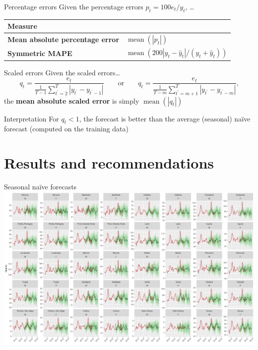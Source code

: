 \documentclass[12pt,aspectratio=169]{beamer}
\begin{document}
\begin{frame}{Percentage errors}
    Given the \alert{percentage} errors $p_{t} = 100 e_{t} / y_{t}$, \ldots
    \begin{center}
        \renewcommand{\arraystretch}{1.5}%
        \begin{tabular}{ll}
            \toprule
            \textbf{Measure} & \\
            \midrule
            \textbf{Mean absolute percentage error} & $\operatorname{mean}(|p_{t}|)$ \\
            \textbf{Symmetric MAPE}                 & $\operatorname{mean}(200 |y_{t} - \hat{y}_{t}| / (y_{t} + \hat{y}_{t}))$ \\
            \bottomrule
        \end{tabular}
    \end{center}
\end{frame}

\begin{frame}{Scaled errors}
    Given the \alert{scaled} errors\ldots
    \[
        q_{t} = \frac{e_{t}}{\frac{1}{T-1} \sum_{t^{\prime} = 2}^{T} |y_{t^{\prime}} - y_{t^{\prime}-1}|}
        \qquad
        \text{or}
        \qquad
        q_{t} = \frac{e_{t}}{\frac{1}{T-m} \sum_{t^{\prime} = m+1}^{T} |y_{t^{\prime}} - y_{t^{\prime}-m}|}
        \text{,}
    \]
    the \textbf{mean absolute scaled error} is simply
    $\operatorname{mean}(|q_{t}|)$
    \vfill
    \begin{block}{Interpretation}
        For $q_{t} < 1$, the forecast is better than the average (seasonal)
        naïve forecast (computed on the training data)
    \end{block}
\end{frame}

\section{Results and recommendations}

\begin{frame}{Seasonal naïve forecasts}
    \centering%
    \includegraphics[height=0.9\textheight]{figures/forecasts_snaive}
\end{frame}
\end{document}
